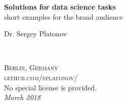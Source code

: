 \documentclass[11pt,fleqn]{book} %
\begin{document}

\begingroup
\thispagestyle{empty}
\centering
\vspace*{5cm}
\par\normalfont\fontsize{35}{35}\sffamily\selectfont
\textbf{Solutions for data science tasks}\\
{\LARGE short examples for the broad audience}\par %
\vspace*{1cm}
{\Huge Dr. Sergey Platonov}\par %
\endgroup


\newpage
~\vfill
\thispagestyle{empty}

\noindent \textsc{Berlin, Germany}\\

\noindent \textsc{github.com/splatonov/}\\ %

\noindent No special license is provided.\\ %

\noindent \textit{March 2018} %



\pagestyle{empty} %

\tableofcontents %


\pagestyle{fancy} %

\end{document}
